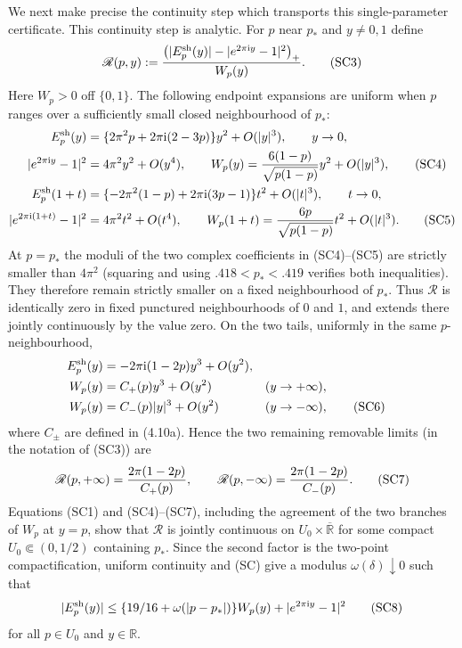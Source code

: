 \documentclass[11pt,a4paper]{article}
\numberwithin{equation}{section}
\theoremstyle{definition}
\theoremstyle{remark}
\newcommand{\ii}{\mathrm i}
\begin{document}
We next make precise the continuity step which transports this
single-parameter certificate. This continuity step is analytic.  For $p$ near $p_*$ and $y\ne0,1$ define
\[
 \mathscr R(p,y):=
 {\bigl(|E_p^{\rm sh}(y)|-|e^{2\pi\ii y}-1|^2\bigr)_+\over W_p(y)}.
                                                               \tag{SC3}
\]
Here $W_p>0$ off $\{0,1\}$.  The following endpoint expansions are
uniform when $p$ ranges over a sufficiently small closed neighbourhood of
$p_*$:
\begin{align*}
 E_p^{\rm sh}(y)
 &=\{2\pi^2p+2\pi\ii(2-3p)\}y^2+O(|y|^3),\qquad y\to0,\\
 |e^{2\pi\ii y}-1|^2&=4\pi^2y^2+O(y^4),\qquad
 W_p(y)={6(1-p)\over\sqrt{p(1-p)}}y^2+O(|y|^3),       \tag{SC4}\\
 E_p^{\rm sh}(1+t)
 &=\{-2\pi^2(1-p)+2\pi\ii(3p-1)\}t^2+O(|t|^3),\qquad t\to0,\\
 |e^{2\pi\ii(1+t)}-1|^2&=4\pi^2t^2+O(t^4),\qquad
 W_p(1+t)={6p\over\sqrt{p(1-p)}}t^2+O(|t|^3).         \tag{SC5}
\end{align*}
At $p=p_*$ the moduli of the two complex coefficients in (SC4)--(SC5)
are strictly smaller than $4\pi^2$ (squaring and using
$.418<p_*<.419$ verifies both inequalities).  They therefore remain
strictly smaller on a fixed neighbourhood of $p_*$.  Thus
$\mathscr R$ is identically zero in fixed punctured neighbourhoods of
$0$ and $1$, and extends there jointly continuously by the value zero.
On the two tails, uniformly in the same $p$-neighbourhood,
\begin{align*}
 E_p^{\rm sh}(y)&=-2\pi\ii(1-2p)y^3+O(y^2),\\
 W_p(y)&=C_+(p)y^3+O(y^2) &&(y\to+\infty),\\
 W_p(y)&=C_-(p)|y|^3+O(y^2) &&(y\to-\infty),          \tag{SC6}
\end{align*}
where $C_\pm$ are defined in (4.10a).  Hence the two remaining removable
limits (in the notation of (SC3)) are
\[
 \mathscr R(p,+\infty)={2\pi(1-2p)\over C_+(p)},\qquad
 \mathscr R(p,-\infty)={2\pi(1-2p)\over C_-(p)}.       \tag{SC7}
\]
Equations (SC1) and (SC4)--(SC7), including the agreement of the two
branches of $W_p$ at $y=p$, show that $\mathscr R$ is jointly continuous
on $U_0\times\overline{\mathbb R}$ for some compact
$U_0\Subset(0,1/2)$ containing $p_*$.  Since the second factor is the
two-point compactification, uniform continuity and (SC) give a modulus
$\omega(\delta)\downarrow0$ such that
\[
 |E_p^{\rm sh}(y)|\le
 \{19/16+\omega(|p-p_*|)\}W_p(y)+|e^{2\pi\ii y}-1|^2             \tag{SC8}
\]
for all $p\in U_0$ and $y\in\mathbb R$.
\end{document}

